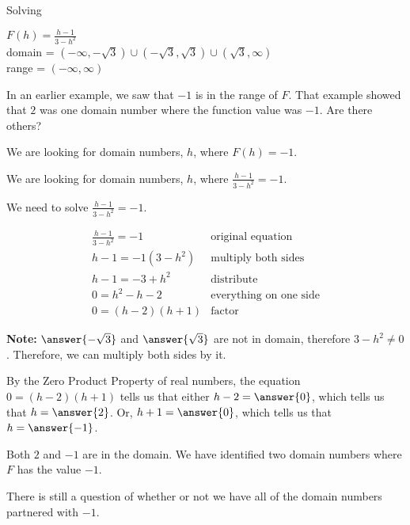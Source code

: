 \documentclass{ximera}
\begin{document}
\begin{example}   Solving 

$F(h) = \frac{h-1}{3-h^2}$ \\
domain = $(-\infty, -\sqrt{3}) \cup (-\sqrt{3}, \sqrt{3}) \cup (\sqrt{3}, \infty)$ \\
range = $(-\infty, \infty)$


In an earlier example, we saw that $-1$ is in the range of $F$.  That example showed that $2$ was one domain number where the function value was $-1$. Are there others?


We are looking for domain numbers, $h$, where $F(h) = -1$.  

We are looking for domain numbers, $h$, where $\frac{h-1}{3-h^2} = -1$.  

We need to solve $\frac{h-1}{3-h^2} = -1$.



\[
\begin{array}{ll}
\frac{h-1}{3-h^2} = -1 &  \text{original equation} \\
h - 1 = -1 (3-h^2)    &  \text{multiply both sides} \\
h - 1 = -3 + h^2    &      \text{distribute} \\
0 = h^2 - h - 2    &      \text{everything on one side} \\
0 =(h-2)(h+1)    &   \text{factor}   
\end{array}
\]


\begin{remark}
\textbf{Note:}  $\answer{-\sqrt{3}}$ and $\answer{\sqrt{3}}$ are not in domain, therefore $3 - h^2 \ne 0$. Therefore, we can multiply both sides by it.  
\end{remark}


By the Zero Product Property of real numbers, the equation $0 =(h-2)(h+1)$ tells us that either $h-2 = \answer{0}$, which tells us that $h = \answer{2}$. Or, $h+1 = \answer{0}$, which tells us that $h = \answer{-1}$.

Both $2$ and $-1$ are in the domain.  We have identified two domain numbers where $F$ has the value $-1$.



\end{example}
There is still a question of whether or not we have all of the domain numbers partnered with $-1$. \\
\end{document}
